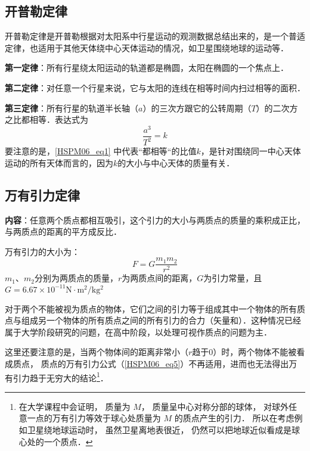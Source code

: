 

\subsection{开普勒定律}

开普勒定律是开普勒根据对太阳系中行星运动的观测数据总结出来的，是一个普适定律，也适用于其他天体绕中心天体运动的情况，如卫星围绕地球的运动等．

\textbf{第一定律}：所有行星绕太阳运动的轨道都是椭圆，太阳在椭圆的一个焦点上．

\textbf{第二定律}：对任意一个行星来说，它与太阳的连线在相等时间内扫过相等的面积．

\textbf{第三定律}：所有行星的轨道半长轴（$a$）的三次方跟它的公转周期（$T$）的二次方之比都相等．表达式为
\begin{equation}\label{HSPM06_eq1}
\frac{a^3}{T^2}=k
\end{equation}
要注意的是，\autoref{HSPM06_eq1} 中代表“都相等“的比值$k$，是针对围绕同一中心天体运动的所有天体而言的，因为$k$的大小与中心天体的质量有关．

\subsection{万有引力定律}

\textbf{内容}：任意两个质点都相互吸引，这个引力的大小与两质点的质量的乘积成正比，与两质点的距离的平方成反比．

万有引力的大小为：
\begin{equation}\label{HSPM06_eq5}
F=G\frac{m_1m_2}{r^2}
\end{equation}
$m_1$、$m_2$分别为两质点的质量，$r$为两质点间的距离，$G$为引力常量，且$G=6.67\times 10^{-11}\mathrm{N\cdot m^2/kg^2}$

对于两个不能被视为质点的物体，它们之间的引力等于组成其中一个物体的所有质点与组成另一个物体的所有质点之间的所有引力的合力（矢量和）．这种情况已经属于大学阶段研究的问题，在高中阶段，以处理可视作质点的问题为主．

这里还要注意的是，当两个物体间的距离非常小（$r$趋于$0$）时，两个物体不能被看成质点， 质点的万有引力公式（\autoref{HSPM06_eq5}）不再适用，进而也无法得出万有引力趋于无穷大的结论\footnote{在大学课程中会证明， 质量为 $M$， 质量呈中心对称分部的球体， 对球外任意一点的万有引力等效于球心处质量为 $M$ 的质点产生的引力． 所以在考虑例如卫星绕地球运动时， 虽然卫星离地表很近， 仍然可以把地球近似看成是球心处的一个质点．}．

